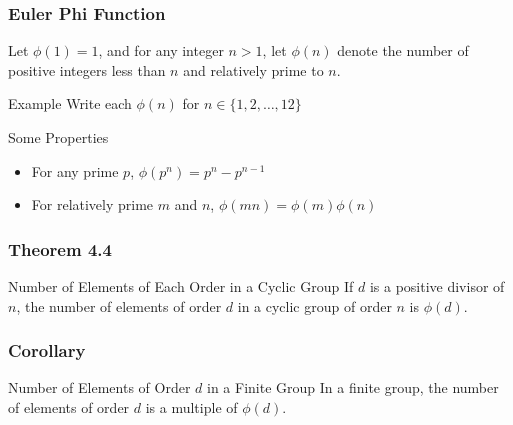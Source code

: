 \documentclass{beamer}
\begin{document}
\begin{frame}
    \frametitle{Euler Phi Function}
Let \(\phi(1)=1\), and for any integer \(n>1\), let \(\phi(n)\) denote the number of positive integers less than \(n\) and relatively prime to \(n\). 

\begin{block}{Example} Write each \(\phi(n)\) for \(n \in \{1,2, \dots, 12\}\)
    
\end{block}


\begin{block}{Some Properties}
    \begin{itemize}
        \item For any prime \(p\), \(\phi(p^n)=p^n-p^{n-1}\)
        \item For relatively prime \(m\) and \(n\), \(\phi(mn)=\phi(m)\phi(n)\)
    \end{itemize}
\end{block}

    

\end{frame}

\begin{frame}
    \frametitle{Theorem 4.4}

    \begin{block}{Number of Elements of Each Order in a Cyclic Group}
        If \(d\) is a positive divisor of \(n\), the number of elements of order \(d\) in a cyclic group of order \(n\) is \(\phi(d)\).         
    \end{block}\pause

\end{frame}

\begin{frame}
    \frametitle{Corollary}

    \begin{block}{Number of Elements of Order \(d\) in a Finite Group}  
        In a finite group, the number of elements of order \(d\) is a multiple of \(\phi(d)\). 
    \end{block}

\end{frame}
\end{document}
